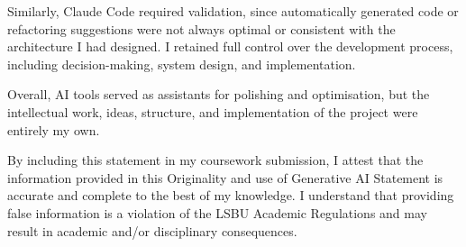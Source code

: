 \begin{appendices}
Similarly, Claude Code required validation, since automatically generated code or refactoring suggestions were not always optimal or consistent with the architecture I had designed. I retained full control over the development process, including decision-making, system design, and implementation.

Overall, AI tools served as assistants for polishing and optimisation, but the intellectual work, ideas, structure, and implementation of the project were entirely my own.

By including this statement in my coursework submission, I attest that the information provided in this Originality and use of Generative AI Statement is accurate and complete to the best of my knowledge. I understand that providing false information is a violation of the LSBU Academic Regulations and may result in academic and/or disciplinary consequences.
\end{appendices}